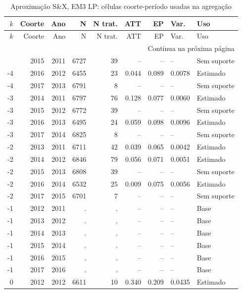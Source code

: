 \begingroup
\tiny
\setlength{\tabcolsep}{2.2pt}
\renewcommand{\arraystretch}{0.82}
\begin{longtable}{rrrrrrrll}
\caption{Aproximação S\&X, EM3 LP: células coorte-período usadas na agregação}
\label{tab:ap_sx_celulas_em3_lp}\\
\toprule
\(k\) & Coorte & Ano & N & N trat. & ATT & EP & Var. & Uso \\
\midrule
\endfirsthead
\toprule
\(k\) & Coorte & Ano & N & N trat. & ATT & EP & Var. & Uso \\
\midrule
\endhead
\midrule
\multicolumn{9}{r}{Continua na próxima página} \\
\endfoot
\bottomrule
\endlastfoot
-4 & 2015 & 2011 & 6727 & 39 & -- & -- & -- & Sem suporte \\
-4 & 2016 & 2012 & 6455 & 23 & 0.044 & 0.089 & 0.0078 & Estimado \\
-4 & 2017 & 2013 & 6791 & 8 & -- & -- & -- & Sem suporte \\
-3 & 2014 & 2011 & 6797 & 76 & 0.128 & 0.077 & 0.0060 & Estimado \\
-3 & 2015 & 2012 & 6772 & 39 & -- & -- & -- & Sem suporte \\
-3 & 2016 & 2013 & 6495 & 24 & 0.059 & 0.098 & 0.0096 & Estimado \\
-3 & 2017 & 2014 & 6825 & 8 & -- & -- & -- & Sem suporte \\
-2 & 2013 & 2011 & 6711 & 42 & 0.039 & 0.065 & 0.0042 & Estimado \\
-2 & 2014 & 2012 & 6846 & 79 & 0.056 & 0.071 & 0.0051 & Estimado \\
-2 & 2015 & 2013 & 6808 & 39 & -- & -- & -- & Sem suporte \\
-2 & 2016 & 2014 & 6532 & 25 & 0.009 & 0.075 & 0.0056 & Estimado \\
-2 & 2017 & 2015 & 6701 & 7 & -- & -- & -- & Sem suporte \\
-1 & 2012 & 2011 & . & . & -- & -- & -- & Base \\
-1 & 2013 & 2012 & . & . & -- & -- & -- & Base \\
-1 & 2014 & 2013 & . & . & -- & -- & -- & Base \\
-1 & 2015 & 2014 & . & . & -- & -- & -- & Base \\
-1 & 2016 & 2015 & . & . & -- & -- & -- & Base \\
-1 & 2017 & 2016 & . & . & -- & -- & -- & Base \\
0 & 2012 & 2012 & 6611 & 10 & 0.340 & 0.209 & 0.0435 & Estimado \\

\end{longtable}
